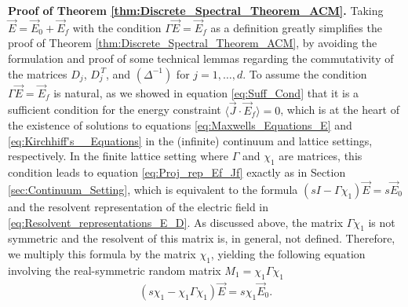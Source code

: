 \documentclass{cmslatex}
\begin{document}
\indent
\textbf{Proof of Theorem \ref{thm:Discrete_Spectral_Theorem_ACM}.}
Taking $\vec{E}=\vec{E}_0+\vec{E}_f$ with the 
condition $\Gamma\vec{E}=\vec{E}_f$ as a definition greatly simplifies the
proof of Theorem \ref{thm:Discrete_Spectral_Theorem_ACM}, by avoiding
the formulation and proof of some technical lemmas regarding the
commutativity of the matrices $D_j$, $D_j^{\,T}$, and $(\Delta^{-1})$ for
$j=1,\ldots,d$. To assume the condition $\Gamma\vec{E}=\vec{E}_f$ is natural,
as we showed in equation \eqref{eq:Suff_Cond} that it is a 
sufficient condition for the energy constraint
$\langle\vec{J}\cdot\vec{E}_f\rangle=0$, which is at the heart of the existence of
solutions to equations \eqref{eq:Maxwells_Equations_E} and
\eqref{eq:Kirchhiff's__Equations} in the (infinite) continuum and
lattice settings, respectively. In the finite lattice setting where
$\Gamma$ and $\chi_1$ are matrices, this condition leads to equation
\eqref{eq:Proj_rep_Ef_Jf} exactly as in Section
\ref{sec:Continuum_Setting}, which is equivalent to the formula
$(sI-\Gamma\chi_1)\vec{E}=s\vec{E}_0$  and the resolvent representation of the
electric field in \eqref{eq:Resolvent_representations_E_D}. As
discussed above, the matrix $\Gamma\chi_1$ is not symmetric
and the resolvent of this matrix is, in general, not
defined. Therefore, we multiply this formula by the matrix $\chi_1$,
yielding the following equation involving the real-symmetric random
matrix $M_1=\chi_1\Gamma\chi_1$   
%
\begin{align}\label{eq:Discrete_Resolvent}
  (s\chi_1-\chi_1\Gamma\chi_1)\vec{E}=s\chi_1\vec{E}_0.
\end{align}
%
\end{document}
